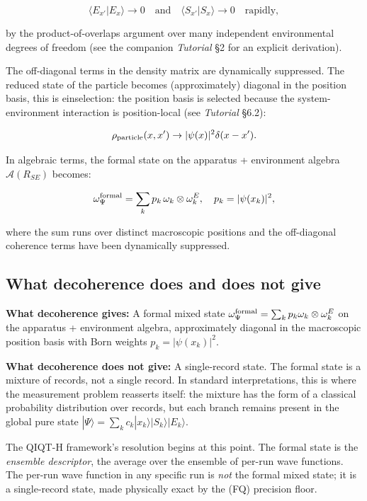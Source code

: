 \documentclass[11pt,a4paper]{article}
\begin{document}
\[
\langle E_{x'} | E_x \rangle \to 0 \quad \text{and} \quad \langle S_{x'} | S_x \rangle \to 0 \quad \text{rapidly},
\]

by the product-of-overlaps argument over many independent environmental degrees of freedom (see the companion \emph{Tutorial} §2 for an explicit derivation).

The off-diagonal terms in the density matrix are dynamically suppressed. The reduced state of the particle becomes (approximately) diagonal in the position basis, this is einselection: the position basis is selected because the system-environment interaction is position-local (see \emph{Tutorial} §6.2):

\[
\rho_{\rm particle}(x, x') \to |\psi(x)|^2 \delta(x - x').
\]

In algebraic terms, the formal state on the apparatus + environment algebra $\hat{\mathcal{A}}(R_{SE})$ becomes:

\[
\omega_\Psi^{\rm formal} = \sum_k p_k\, \omega_k \otimes \omega_k^E, \quad p_k = |\psi(x_k)|^2,
\]

where the sum runs over distinct macroscopic positions and the off-diagonal coherence terms have been dynamically suppressed.

\subsection{What decoherence does and does not give}

\textbf{What decoherence gives:} A formal mixed state $\omega_\Psi^{\rm formal} = \sum_k p_k \omega_k \otimes \omega_k^E$ on the apparatus + environment algebra, approximately diagonal in the macroscopic position basis with Born weights $p_k = |\psi(x_k)|^2$.

\textbf{What decoherence does not give:} A single-record state. The formal state is a mixture of records, not a single record. In standard interpretations, this is where the measurement problem reasserts itself: the mixture has the form of a classical probability distribution over records, but each branch remains present in the global pure state $|\Psi\rangle = \sum_k c_k |x_k\rangle|S_k\rangle|E_k\rangle$.

The QIQT-H framework's resolution begins at this point. The formal state is the \emph{ensemble descriptor}, the average over the ensemble of per-run wave functions. The per-run wave function in any specific run is \emph{not} the formal mixed state; it is a single-record state, made physically exact by the (FQ) precision floor.
\end{document}
